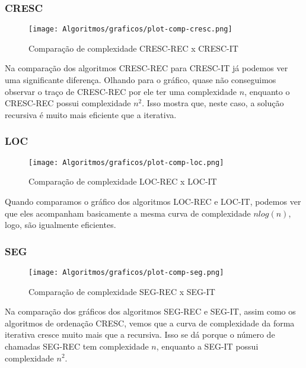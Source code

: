 \documentclass[a4paper, 12pt]{article}
\begin{document}
\newpage
\subsubsection{CRESC}

\begin{figure}[h]
	\centering
	\texttt{[image: Algoritmos/graficos/plot-comp-cresc.png]}
	\caption{Comparação de complexidade CRESC-REC x CRESC-IT}
	\label{fig:cresc}
\end{figure}

Na comparação dos algoritmos CRESC-REC para CRESC-IT já podemos ver uma significante diferença. Olhando para o gráfico, quase não conseguimos observar o traço de CRESC-REC por ele ter uma complexidade $n$, enquanto o CRESC-REC possui complexidade $n^2$. Isso mostra que, neste caso, a solução recursiva é muito mais eficiente que a iterativa.

\newpage
\subsubsection{LOC}

\begin{figure}[h]
	\centering
	\texttt{[image: Algoritmos/graficos/plot-comp-loc.png]}
	\caption{Comparação de complexidade LOC-REC x LOC-IT}
	\label{fig:loc}
\end{figure}

Quando comparamos o gráfico dos algoritmos LOC-REC e LOC-IT, podemos ver que eles acompanham basicamente a mesma curva de complexidade $nlog(n)$, logo, são igualmente eficientes.
	
\newpage

\subsubsection{SEG}

\begin{figure}[h]
	\centering
	\texttt{[image: Algoritmos/graficos/plot-comp-seg.png]}
	\caption{Comparação de complexidade SEG-REC x SEG-IT}
	\label{fig:seg}
\end{figure}

Na comparação dos gráficos dos algoritmos SEG-REC e SEG-IT, assim como os algoritmos de ordenação CRESC, vemos que a curva de complexidade da forma iterativa cresce muito mais que a recursiva. Isso se dá porque o número de chamadas SEG-REC tem complexidade $n$, enquanto a SEG-IT possui complexidade $n^2$.
\end{document}
